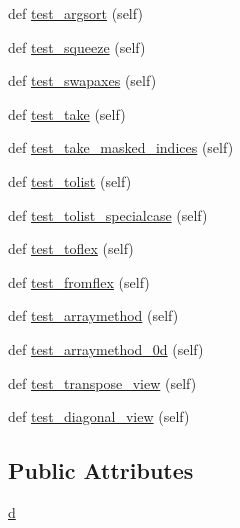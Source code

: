 \begin{DoxyCompactItemize}
\item 
def \hyperlink{classnumpy_1_1ma_1_1tests_1_1test__core_1_1TestMaskedArrayMethods_ad552a4c845c51c597177ee1747b53cc7}{test\+\_\+argsort} (self)
\item 
def \hyperlink{classnumpy_1_1ma_1_1tests_1_1test__core_1_1TestMaskedArrayMethods_ab1c87378ec76702bfd18eaf562a85cd2}{test\+\_\+squeeze} (self)
\item 
def \hyperlink{classnumpy_1_1ma_1_1tests_1_1test__core_1_1TestMaskedArrayMethods_a9664a2db55662f1c85ef19cc9ceaf430}{test\+\_\+swapaxes} (self)
\item 
def \hyperlink{classnumpy_1_1ma_1_1tests_1_1test__core_1_1TestMaskedArrayMethods_a7bb0319a5d022e1abdf5733996e35fad}{test\+\_\+take} (self)
\item 
def \hyperlink{classnumpy_1_1ma_1_1tests_1_1test__core_1_1TestMaskedArrayMethods_acb9b247e67f2648b761f3578e75dff0e}{test\+\_\+take\+\_\+masked\+\_\+indices} (self)
\item 
def \hyperlink{classnumpy_1_1ma_1_1tests_1_1test__core_1_1TestMaskedArrayMethods_af7c82ff074d4d9fee8d2310211da1235}{test\+\_\+tolist} (self)
\item 
def \hyperlink{classnumpy_1_1ma_1_1tests_1_1test__core_1_1TestMaskedArrayMethods_afb4c93391552e508b3c13782f8eb6336}{test\+\_\+tolist\+\_\+specialcase} (self)
\item 
def \hyperlink{classnumpy_1_1ma_1_1tests_1_1test__core_1_1TestMaskedArrayMethods_a54c67613fe7fe2e2fcf310540b323029}{test\+\_\+toflex} (self)
\item 
def \hyperlink{classnumpy_1_1ma_1_1tests_1_1test__core_1_1TestMaskedArrayMethods_a1ec32cb8d30ed6615deb5ec9c7560258}{test\+\_\+fromflex} (self)
\item 
def \hyperlink{classnumpy_1_1ma_1_1tests_1_1test__core_1_1TestMaskedArrayMethods_a915dc78ea083a6ef29ef740156af82e2}{test\+\_\+arraymethod} (self)
\item 
def \hyperlink{classnumpy_1_1ma_1_1tests_1_1test__core_1_1TestMaskedArrayMethods_abe7429d907c6dbba7b847f9e1de31d3d}{test\+\_\+arraymethod\+\_\+0d} (self)
\item 
def \hyperlink{classnumpy_1_1ma_1_1tests_1_1test__core_1_1TestMaskedArrayMethods_a104bcba3dab94bed3cd6b0e545678609}{test\+\_\+transpose\+\_\+view} (self)
\item 
def \hyperlink{classnumpy_1_1ma_1_1tests_1_1test__core_1_1TestMaskedArrayMethods_a41f47987df9ab42dd328244cafefb3a6}{test\+\_\+diagonal\+\_\+view} (self)
\end{DoxyCompactItemize}
\subsection*{Public Attributes}
\begin{DoxyCompactItemize}
\item 
\hyperlink{classnumpy_1_1ma_1_1tests_1_1test__core_1_1TestMaskedArrayMethods_a90f026e0501e05c66b84366c106d8d24}{d}
\end{DoxyCompactItemize}


